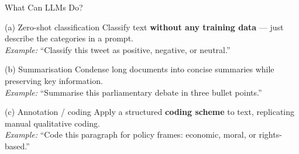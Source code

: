 \documentclass[aspectratio=169]{beamer}
\begin{document}
\begin{frame}{What Can LLMs Do?}
    \small
    \begin{exampleblock}{ (a) Zero-shot classification}
        Classify text \textbf{without any training data} --- just describe the categories in a prompt.\\
        {\footnotesize \textit{Example:} ``Classify this tweet as positive, negative, or neutral.''}
    \end{exampleblock}

    \begin{exampleblock}{ (b) Summarisation}
        Condense long documents into concise summaries while preserving key information.\\
        {\footnotesize \textit{Example:} ``Summarise this parliamentary debate in three bullet points.''}
    \end{exampleblock}

    \begin{exampleblock}{ (c) Annotation / coding}
        Apply a structured \textbf{coding scheme} to text, replicating manual qualitative coding.\\
        {\footnotesize \textit{Example:} ``Code this paragraph for policy frames: economic, moral, or rights-based.''}
    \end{exampleblock}
\end{frame}
\end{document}
